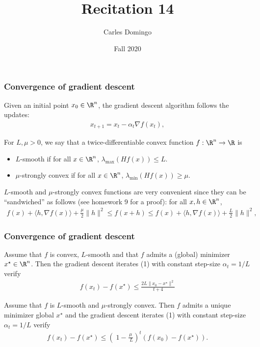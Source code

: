 \documentclass{beamer}
\title{Recitation 14}
\author{Carles Domingo}
\date{Fall 2020}
\begin{document}
\frame{\titlepage} 

\setcounter{showProgressBar}{0}
\setcounter{showSlideNumbers}{1}

\begin{frame}[t]
\frametitle{Convergence of gradient descent}
Given an initial point $x_0 \in \R^n$, the gradient descent algorithm follows the updates:
\begin{align}
x_{t+1} = x_t - \alpha_t \nabla f(x_t),
\end{align}
\begin{definition}
For $L, \mu > 0$, we say that a twice-differentiable convex function $f : \R^n \rightarrow \R$ is 
\begin{itemize}
\item $L$-smooth if for all $x \in \R^n$, $\lambda_{\max}(Hf (x)) \leq L$.
\item $\mu$-strongly convex if for all $x \in \R^n$, $\lambda_{\min}(Hf (x)) \geq \mu$.
\end{itemize}
\end{definition}
$L$-smooth and $\mu$-strongly convex functions are very convenient since they can be “sandwiched” as follows (see homework 9 for a proof): for all $x,h \in \R^n$,
\begin{align}
f(x)+ \langle h, \nabla f(x) \rangle +\frac{\mu}{2} \|h\|^2 \leq f(x+h) \leq f(x)+ \langle h, \nabla f(x)\rangle + \frac{L}{2} \|h\|^2, 
\end{align}
\end{frame}

\begin{frame}[t]
\frametitle{Convergence of gradient descent}
\begin{theorem}
Assume that $f$ is convex, $L$-smooth and that $f$ admits a (global) minimizer $x^{\star} \in \R^n$. Then the gradient descent iterates (1) with constant step-size $\alpha_t = 1/L$ verify
\begin{align}
f(x_t)- f(x^{\star}) \leq \frac{2L \|x_0 - x^{\star}\|^2}{t+4} 
\end{align}
\end{theorem}
\vspace{-3pt}
\begin{theorem}
Assume that $f$ is $L$-smooth and $\mu$-strongly convex. Then $f$ admits a unique minimizer global $x^{\star}$ and the gradient descent iterates (1) with constant step-size $\alpha_t = 1/L$ verify
\begin{align}
f(x_t) - f(x^{\star}) \leq \left(􏰉1 - \frac{\mu}{􏰊L}\right)^t (f(x_0)-f(x^{\star})).
\end{align}
\end{theorem}
\end{frame}
\end{document}
